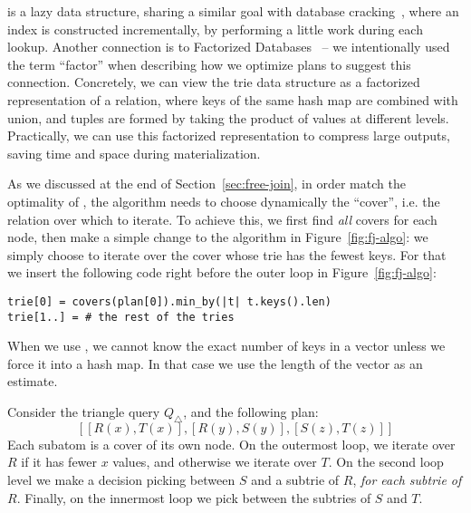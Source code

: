 \COLT is a lazy data structure, sharing a similar goal with database
cracking~\cite{DBLP:conf/cidr/IdreosKM07,DBLP:conf/sigmod/IdreosKM07}, where an
index is constructed incrementally, by performing a little work during each
lookup. 
Another connection is to Factorized Databases~\cite{DBLP:journals/sigmod/OlteanuS16} -- we
intentionally used the term ``factor'' when describing how we optimize \FJ plans to
suggest this connection. 
Concretely, we can view the trie data structure as a
factorized representation of a relation, where keys of the same hash map are
combined with union, and tuples are formed by taking the product of values at
different levels. Practically, we can use this factorized representation to 
compress large outputs, saving time and space during materialization.

As we discussed at the end of Section~\ref{sec:free-join}, in order
match the optimality of \GJ, the \FJ algorithm needs to choose
dynamically the ``cover'', i.e. the relation over which to iterate.  To
achieve this, we first find {\em all} covers for each node, then make a simple
change to the \FJ algorithm in Figure~\ref{fig:fj-algo}: we simply
choose to iterate over the cover whose trie has the fewest keys.  For
that we insert the following code right before the outer loop in
Figure~\ref{fig:fj-algo}:
%
\begin{lstlisting}
trie[0] = covers(plan[0]).min_by(|t| t.keys().len)
trie[1..] = # the rest of the tries
\end{lstlisting}
%
When we use \COLTs, we cannot know the exact number of keys in a vector unless
  we force it into a hash map. In that case we use the length of the vector as
  an estimate.

\begin{example}
  Consider the triangle query $Q_\triangle$, and the following \FJ plan:
  $$[[R(x), T(x)], [R(y), S(y)], [S(z), T(z)]]$$  Each subatom is a
  cover of its own node.  On the outermost loop, we iterate over $R$
  if it has fewer $x$ values, and otherwise we iterate over $T$.  On
  the second loop level we make a decision picking between $S$ and a
  subtrie of $R$, \emph{for each subtrie of $R$}.  Finally, on the
  innermost loop we pick between the subtries of $S$ and $T$.
\end{example}

